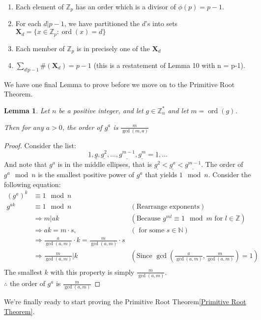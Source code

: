\documentclass[10pt]{article}
\newcommand{\N}{\mathbb{N}}
\newcommand{\Z}{\mathbb{Z}}
\newtheorem{lemma}[theorem]{Lemma}
\theoremstyle{definition}
\theoremstyle{remark}
\def\Z{\mathbb{ Z}}
\def\N{\mathbb{N}}
\def\ul{\underline}
\DeclareMathOperator{\ord}{ord}
\newcommand{\mb}[1]{\mathbf{#1}}
\begin{document}
\begin{enumerate}
\item Each element of $\Z_{p}$ has an order which is a divisor of $\phi(p) = p-1$.
\item For each $d|p-1$, we have partitioned the $d$'s into sets $\mb{X}_d = \{x \in \Z_{p} : \ord(x) = d\}$ 
\item Each member of $\Z_{p}$ is in precisely one of the $\mb{X}_d$
\item $\sum_{d|p-1}\#(\mb{X}_d) = p-1$ (this is a restatement of Lemma 10 with n = p-1).
\end{enumerate}
We have one final Lemma to prove before we move on to the Primitive Root Theorem.
\begin{lemma}
Let $n$ be a positive integer, and let $g \in \Z_{n}^*$ and let $m = \ord(g)$.

Then for any $a > 0$, the order of $g^a$ is $\frac{m}{\gcd(m,a)}$
\end{lemma}
\begin{proof}
Consider the list:
$$\ul{1},\ul{g},\ul{g^2},\ldots,\ul{g^{m-1}},\ul{g^m}=\ul{1},\ldots$$
And note that $g^a$ is in the middle ellipses, that is $\ul{g^2} < \ul{g^a} < \ul{g^{m-1}}$.
The order of $g^a \mod n$ is the smallest positive power of $g^a$ that yields $1 \mod n$.  Consider the following equation: 
\begin{align*}
(g^a)^k &\equiv 1 \mod n &\\
g^{ak} &\equiv 1 \mod n &(\text{Rearrange exponents})\\
&\Rightarrow m|ak &(\text{Because $g^{ml} \equiv 1 \mod m$ for $l \in \Z$})\\
&\Rightarrow ak = m \cdot s, &(\text{ for some } s \in \N) \\
&\Rightarrow \frac{a}{\gcd(a,m)} \cdot k = \frac{m}{\gcd(a,m)} \cdot s \\
&\Rightarrow \frac{m}{\gcd(a,m)}|k &(\text{Since $\gcd(\frac{a}{\gcd(a,m)},\frac{m}{\gcd(a,m)})=1$})\\
\end{align*}
The smallest $k$ with this property is simply $\frac{m}{\gcd(a,m)}$.\\
$\therefore$ the order of $g^a$ is $\frac{m}{\gcd(a,m)}$
\end{proof}
\pagebreak
We're finally ready to start proving the Primitive Root Theorem\ref{Primitive Root Theorem}.
\end{document}
